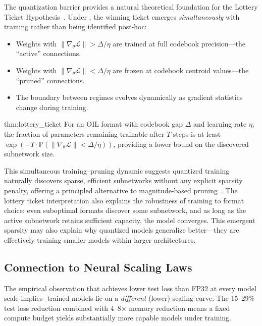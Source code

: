 The quantization barrier provides a natural theoretical foundation for the Lottery Ticket Hypothesis~\cite{frankle2019}. Under \OIL{}, the winning ticket emerges \textit{simultaneously} with training rather than being identified post-hoc:

\begin{itemize}
    \item Weights with $\|\nabla_\theta \mathcal{L}\| > \Delta/\eta$ are trained at full codebook precision---the ``active'' connections.
    \item Weights with $\|\nabla_\theta \mathcal{L}\| < \Delta/\eta$ are frozen at codebook centroid values---the ``pruned'' connections.
    \item The boundary between regimes evolves dynamically as gradient statistics change during training.
\end{itemize}

\begin{mythm}{thm:lottery_ticket}
For an OIL format with codebook gap $\Delta$ and learning rate $\eta$, the fraction of parameters remaining trainable after $T$ steps is at least $\exp(-T \cdot \mathbb{P}(\|\nabla_\theta \mathcal{L}\| < \Delta/\eta))$, providing a lower bound on the discovered subnetwork size.
\end{mythm}

This simultaneous training--pruning dynamic suggests quantized training naturally discovers sparse, efficient subnetworks without any explicit sparsity penalty, offering a principled alternative to magnitude-based pruning~\cite{han2015}. The lottery ticket interpretation also explains the robustness of \OIL{} training to format choice: even suboptimal formats discover some subnetwork, and as long as the active subnetwork retains sufficient capacity, the model converges. This emergent sparsity may also explain why quantized models generalize better---they are effectively training smaller models within larger architectures.

\subsection{Connection to Neural Scaling Laws}

The empirical observation that \OIL{} achieves lower test loss than FP32 at every model scale implies \OIL{}-trained models lie on a \textit{different} (lower) scaling curve. The 15--29\% test loss reduction combined with 4--8$\times$ memory reduction means a fixed compute budget yields substantially more capable models under \OIL{} training.

